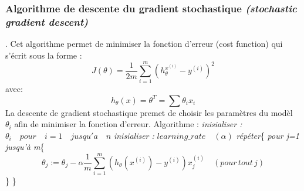 \documentclass[a4paper,11pt]{report}
\begin{document}
\subsubsection*{Algorithme de descente du gradient stochastique \textit{(stochastic gradient descent)}}.\newline
Cet algorithme permet de minimiser la fonction d'erreur (cost function) qui s'écrit sous la forme : \newline
$$J(\theta) = \dfrac{1}{2m}\sum_{i=1}^{m} (h_{\theta}^{x^{(i)}} - y^{(i)})^2$$\newline  
avec: \newline
$$h_{\theta}(x) = \theta^T = \sum \theta_ix_i $$
\newline
La descente de gradient stochastique premet de choisir les paramètres du modèl $\theta_i$ afin de minimiser la fonction d'erreur.\newline
Algorithme : \newline
\textit{inisialiser :} $\theta_i\quad pour\quad i=1 \quad jusqu'a\quad n$\newline
\textit{inisialiser : }$learning\_rate\quad(\alpha)$\newline
\textit{répéter}\{\newline 
\hspace*{1cm}\textit{pour j=1 jusqu'à m}\{
$$\theta_j := \theta_j - \alpha  \dfrac{1}{m}\sum_{i = 1}^{m} (h_\theta(x^{(i)}) - y^{(i)})x_j^{(i)} \quad(pour\, tout \, j)$$
\hspace*{1cm}\}\newline
\} 
\end{document}
